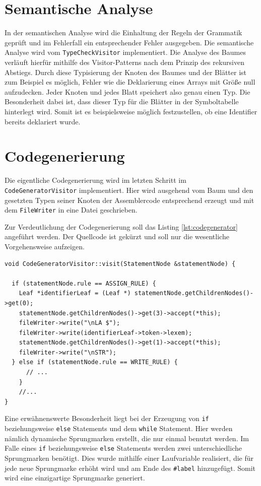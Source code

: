 \documentclass[a4paper,11pt]{report}
\begin{document}
\section{Semantische Analyse}
In der semantischen Analyse wird die Einhaltung der Regeln der Grammatik geprüft und im Fehlerfall ein entsprechender Fehler ausgegeben.
Die semantische Analyse wird vom \texttt{TypeCheckVisitor} implementiert.
Die Analyse des Baumes verläuft hierfür mithilfe des Visitor-Patterns nach dem Prinzip des rekursiven Abstiegs.
Durch diese Typisierung der Knoten des Baumes und der Blätter ist zum Beispiel es möglich, Fehler wie die Deklarierung eines Arrays mit Größe null aufzudecken.
Jeder Knoten und jedes Blatt speichert also genau einen Typ.
Die Besonderheit dabei ist, dass dieser Typ für die Blätter in der Symboltabelle hinterlegt wird.
Somit ist es beispielsweise möglich festzustellen, ob eine Identifier bereits deklariert wurde.

\section{Codegenerierung}
Die eigentliche Codegenerierung wird im letzten Schritt im \texttt{CodeGenerator\-Visitor} implementiert.
Hier wird ausgehend vom Baum und den gesetzten Typen seiner Knoten der Assemblercode entsprechend erzeugt und mit dem \texttt{FileWriter} in eine Datei geschrieben.

Zur Verdeutlichung der Codegenerierung soll das Listing \ref{lst:codegenerator} angeführt werden.
Der Quellcode ist gekürzt und soll nur die wesentliche Vorgehensweise aufzeigen.

\begin{lstlisting}[caption=Codegenerierung, label=lst:codegenerator]
void CodeGeneratorVisitor::visit(StatementNode &statementNode) {

  if (statementNode.rule == ASSIGN_RULE) {
    Leaf *identifierLeaf = (Leaf *) statementNode.getChildrenNodes()->get(0);
    statementNode.getChildrenNodes()->get(3)->accept(*this);
    fileWriter->write("\nLA $");
    fileWriter->write(identifierLeaf->token->lexem);
    statementNode.getChildrenNodes()->get(1)->accept(*this);
    fileWriter->write("\nSTR");
  } else if (statementNode.rule == WRITE_RULE) {
      // ...
    }
    //...
}
\end{lstlisting}

Eine erwähnenswerte Besonderheit liegt bei der Erzeugung von \texttt{if} beziehungsweise \texttt{else} Statements und dem \texttt{while} Statement.
Hier werden nämlich dynamische Sprungmarken erstellt, die nur einmal benutzt werden.
Im Falle eines \texttt{if} beziehungsweise \texttt{else} Statements werden zwei unterschiedliche Sprungmarken benötigt.
Dies wurde mithilfe einer Laufvariable realisiert, die für jede neue Sprungmarke erhöht wird und am Ende des \texttt{\#label} hinzugefügt.
Somit wird eine einzigartige Sprungmarke generiert.
\end{document}
